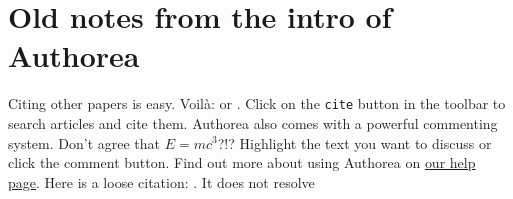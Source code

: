 \section{Old notes from the intro of Authorea}

Citing other papers is easy. Voilà: \cite{2012} or \cite{Holstein_2009}. Click on the \verb|cite| button in the toolbar to search articles and cite them. Authorea also comes with a powerful commenting system. Don't agree that $E  =  mc^{3}$?!? Highlight the text you want to discuss or click the comment button. Find out more about using Authorea on \href{https://www.authorea.com/help}{our help page}. Here is a loose citation: \cite{Hogeweg_2011}. It does not resolve\ldot
  
  
  
  
